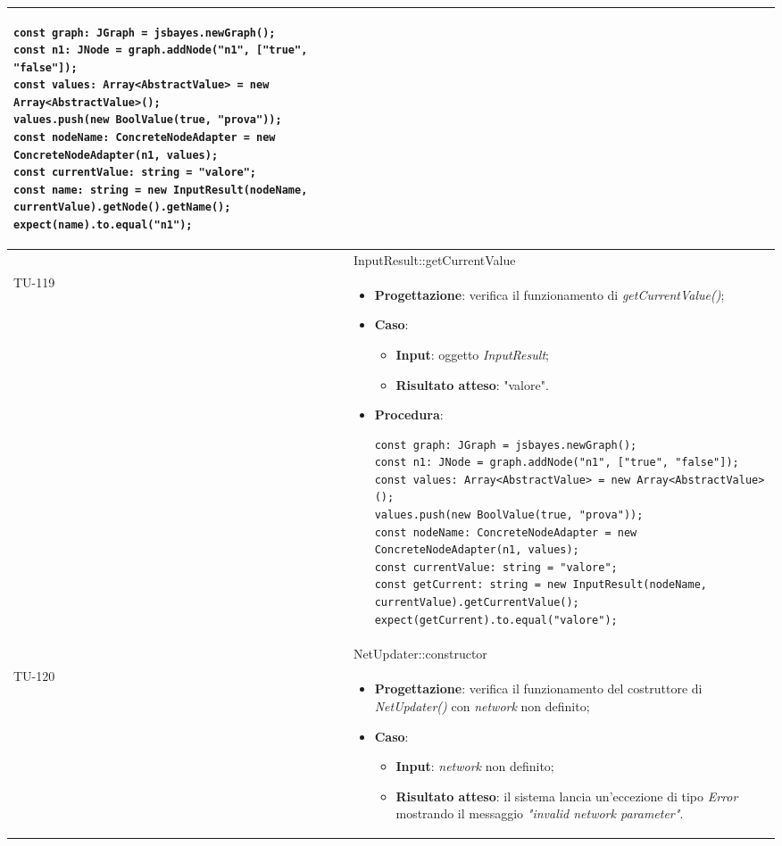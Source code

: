 \begin{longtable}{|C{1.5cm}|C{14.5cm}|}
\begin{itemize}
\begin{lstlisting}
const graph: JGraph = jsbayes.newGraph();
const n1: JNode = graph.addNode("n1", ["true", "false"]);
const values: Array<AbstractValue> = new Array<AbstractValue>();
values.push(new BoolValue(true, "prova"));
const nodeName: ConcreteNodeAdapter = new ConcreteNodeAdapter(n1, values);
const currentValue: string = "valore";
const name: string = new InputResult(nodeName, currentValue).getNode().getName();
expect(name).to.equal("n1");
	\end{lstlisting}
\end{itemize}\\
\hline
{} & InputResult::getCurrentValue
\\ \hline
{TU-119} &
\begin{itemize}
	\item \textbf{Progettazione}: verifica il funzionamento di \emph{getCurrentValue()};
	\item \textbf{Caso}: 
	\begin{itemize}
		\item \textbf{Input}: oggetto \emph{InputResult};
		\item \textbf{Risultato atteso}: "valore".
	\end{itemize}
	\item \textbf{Procedura}:
	\begin{lstlisting}
const graph: JGraph = jsbayes.newGraph();
const n1: JNode = graph.addNode("n1", ["true", "false"]);
const values: Array<AbstractValue> = new Array<AbstractValue>();
values.push(new BoolValue(true, "prova"));
const nodeName: ConcreteNodeAdapter = new ConcreteNodeAdapter(n1, values);
const currentValue: string = "valore";
const getCurrent: string = new InputResult(nodeName, currentValue).getCurrentValue();
expect(getCurrent).to.equal("valore");
	\end{lstlisting}
\end{itemize}\\
\hline
{} & NetUpdater::constructor
\\ \hline
{TU-120} &
\begin{itemize}
	\item \textbf{Progettazione}: verifica il funzionamento del costruttore di \emph{NetUpdater()} con \emph{network} non definito;
	\item \textbf{Caso}: 
	\begin{itemize}
		\item \textbf{Input}: \emph{network} non definito;
		\item \textbf{Risultato atteso}: il sistema lancia un'eccezione di tipo \emph{Error} mostrando il messaggio \emph{"invalid network parameter"}.

\end{itemize}
\end{itemize}
\end{longtable}
